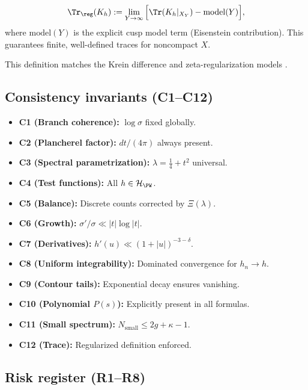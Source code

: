 \begin{definition}
\[
\Tr_{\reg}(K_h) := \lim_{Y\to\infty} \Big[ \Tr(K_h|_{X_Y}) - \mathrm{model}(Y) \Big],
\]
where $\mathrm{model}(Y)$ is the explicit cusp model term
(Eisenstein contribution). This guarantees finite, well-defined
traces for noncompact $X$.
\end{definition}

\begin{remark}
This definition matches the Krein difference and zeta-regularization models
\cite{LaxPhillips1976, Hejhal1983}.
\end{remark}

\subsection{Consistency invariants (C1–C12)}

\begin{itemize}
\item {\bf C1 (Branch coherence):} $\log\sigma$ fixed globally.
\item {\bf C2 (Plancherel factor):} $dt/(4\pi)$ always present.
\item {\bf C3 (Spectral parametrization):} $\lambda=\tfrac14+t^2$ universal.
\item {\bf C4 (Test functions):} All $h\in\mathcal H_{\PW}$.
\item {\bf C5 (Balance):} Discrete counts corrected by $\Xi(\lambda)$.
\item {\bf C6 (Growth):} $\sigma'/\sigma \ll |t|\log|t|$.
\item {\bf C7 (Derivatives):} $h'(u)\ll (1+|u|)^{-3-\delta}$.
\item {\bf C8 (Uniform integrability):} Dominated convergence for $h_n\to h$.
\item {\bf C9 (Contour tails):} Exponential decay ensures vanishing.
\item {\bf C10 (Polynomial $P(s)$):} Explicitly present in all formulas.
\item {\bf C11 (Small spectrum):} $N_{\mathrm{small}}\le 2g+\kappa-1$.
\item {\bf C12 (Trace):} Regularized definition enforced.
\end{itemize}

\subsection{Risk register (R1–R8)}

